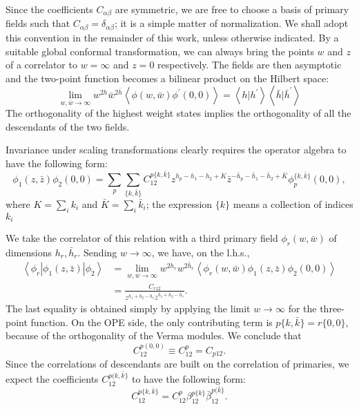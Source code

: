 \documentclass[aps,prb,superscriptaddress,nofootinbib]{revtex4}
\begin{document}
Since the coefficients $C_{\alpha \beta}$ are symmetric, we are free to choose a basis of primary fields such that $C_{\alpha \beta}=\delta_{\alpha \beta}$; it is a simple matter of normalization. 
We shall adopt this convention in the remainder of this work, unless otherwise indicated.
By a suitable global conformal transformation, we can always bring the points $w$ and $z$ of a correlator to $w=\infty$ and $z=0$ respectively. 
The fields are then asymptotic and the two-point function becomes a bilinear product on the Hilbert space:
\begin{equation}
	\lim_{w, \bar{w} \rightarrow \infty} w^{2 h} \bar{w}^{2 \bar{h}}\left\langle\phi(w, \bar{w}) \phi^{\prime}(0,0)\right\rangle 
	= \left\langle h | h^{\prime}\right\rangle\left\langle\bar{h} | \bar{h}^{\prime}\right\rangle
\end{equation}
The orthogonality of the highest weight states implies the orthogonality of all the descendants of the two fields.

Invariance under scaling transformations clearly requires the operator algebra to have the following form:
\begin{equation}
	\phi_{1}(z, \bar{z}) \phi_{2}(0,0)=\sum_{p} \sum_{\{k, \bar{k}\}} C_{12}^{p\{k, \bar{k}\}} z^{h_{p}-h_{1}-h_{2}+K} \bar{z}^{-\bar{h}_{p}-\bar{h}_{1}-\bar{h}_{2}+\bar{K}} 
	\phi^{\{k, \bar{k}\}}_p(0,0),
\end{equation}
where $K=\sum_{i} k_{i}$ and $\bar{K}=\sum_{i} \bar{k}_{i}$; the expression $\{k\}$ means a collection of indices $k_{i}$

We take the correlator of this relation with a third primary field $\phi_{r}(w, \bar{w})$ of dimensions $h_{r}, \bar{h}_{r}$. 
Sending $w \rightarrow \infty$, we have, on the l.h.s.,
\begin{equation}
\begin{aligned}
	\left\langle\phi_{r}\left|\phi_{1}(z, \bar{z})\right| \phi_{2}\right\rangle &=\lim _{w, \bar{w} \rightarrow \infty} w^{2 h_{r}} w^{2 \bar{h}_{r}}\left\langle\phi_{r}(w, \bar{w}) \phi_{1}(z, \bar{z}) \phi_{2}(0,0)\right\rangle \\
	&=\frac{C_{r 12}}{z^{h_{1}+h_{2}-h_{r}} \bar{z}^{\bar{h}_{1}+\bar{h}_{2}-\bar{h}_{r}}}.
\end{aligned}
\end{equation}
The last equality is obtained simply by applying the limit $w \rightarrow \infty$ for the three-point function. 
On the OPE side, the only contributing term is $p\{k, \bar{k}\}=r\{0,0\}$, because of the orthogonality of the Verma modules. 
We conclude that
\begin{equation}
	C_{12}^{p(0,0)} \equiv C_{12}^{p}=C_{p 12}.
\end{equation}
Since the correlations of descendants are built on the correlation of primaries, we expect the coefficients $C_{12}^{p(k, \bar{k}\}}$ to have the following form:
\begin{equation}
	C_{12}^{p \{ k, \bar{k}\}}=C_{12}^{p} \beta_{12}^{p\{k\}} \bar{\beta}_{12}^{p(\bar{k}\}}.
\end{equation}
\end{document}
